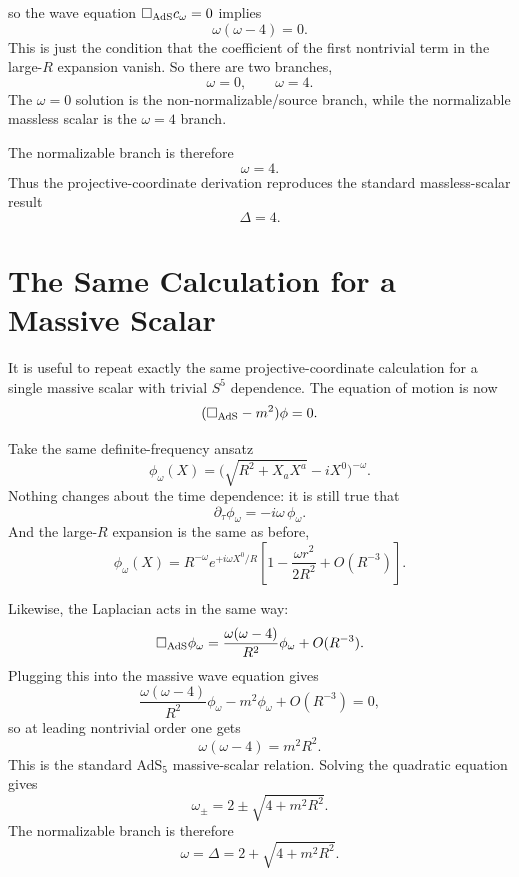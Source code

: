 \documentclass[12pt]{article}
\newcommand{\D}{\Delta}
\begin{document}
so the wave equation $\Box_{\rm AdS}c_\omega=0$ implies
\begin{equation}
\omega(\omega-4)=0.
\end{equation}
This is just the condition that the coefficient of the first nontrivial term in the large-$R$ expansion
vanish.  So there are two branches,
\[
\omega=0,\qquad \omega=4.
\]
The $\omega=0$ solution is the non-normalizable/source branch, while the normalizable massless scalar is
the $\omega=4$ branch.

The normalizable branch is therefore
\begin{equation}
\omega=4.
\end{equation}
Thus the projective-coordinate derivation reproduces the standard massless-scalar result
\begin{equation}
\D=4.
\end{equation}

\section{The Same Calculation for a Massive Scalar}

It is useful to repeat exactly the same projective-coordinate calculation for a single massive scalar with
trivial $S^5$ dependence.  The equation of motion is now
\begin{equation}
(\Box_{\rm AdS}-m^2)\phi=0.
\end{equation}

Take the same definite-frequency ansatz
\begin{equation}
\phi_\omega(X)=\Big(\sqrt{R^2+X_aX^a}-iX^0\Big)^{-\omega}.
\end{equation}
Nothing changes about the time dependence: it is still true that
\begin{equation}
\partial_\tau\phi_\omega=-i\omega\,\phi_\omega.
\end{equation}
And the large-$R$ expansion is the same as before,
\begin{equation}
\phi_\omega(X)=
R^{-\omega}e^{+i\omega X^0/R}
\left[1-\frac{\omega r^2}{2R^2}+O(R^{-3})\right].
\end{equation}

Likewise, the Laplacian acts in the same way:
\begin{equation}
\Box_{\rm AdS}\phi_\omega
=
\frac{\omega(\omega-4)}{R^2}\phi_\omega+O(R^{-3}).
\end{equation}
Plugging this into the massive wave equation gives
\begin{equation}
\frac{\omega(\omega-4)}{R^2}\phi_\omega-m^2\phi_\omega+O(R^{-3})=0,
\end{equation}
so at leading nontrivial order one gets
\begin{equation}
\omega(\omega-4)=m^2R^2.
\end{equation}
This is the standard AdS$_5$ massive-scalar relation.  Solving the quadratic equation gives
\begin{equation}
\omega_\pm=2\pm \sqrt{4+m^2R^2}.
\end{equation}
The normalizable branch is therefore
\begin{equation}
\omega=\D=2+\sqrt{4+m^2R^2}.
\end{equation}
\end{document}
